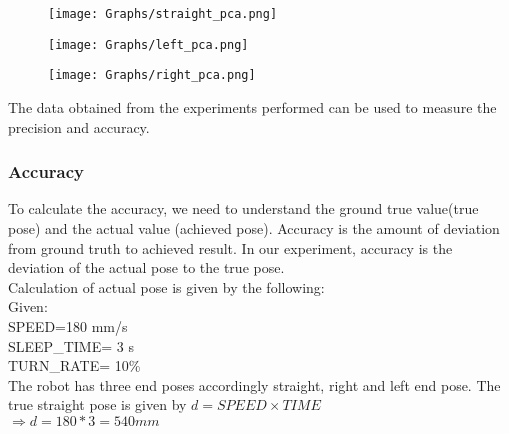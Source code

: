 \begin{figure}[H]
	\centering
	\texttt{[image: Graphs/straight\_pca.png]}
\end{figure}

\begin{figure}[H]
	\centering
	\texttt{[image: Graphs/left\_pca.png]}
\end{figure}

\begin{figure}[H]
	\centering
	\texttt{[image: Graphs/right\_pca.png]}
\end{figure}



The data obtained from the experiments performed can be used to measure the precision and accuracy.

\color{blue}\subsubsection{Accuracy}

To calculate the accuracy, we need to understand the ground true value(true pose) and the actual value (achieved pose). Accuracy is the amount of deviation from ground truth to achieved result. In our experiment, accuracy is the deviation of the actual pose to the true pose.\\
Calculation of actual pose is given by the following:\\
Given: \\
	SPEED=180 mm/s\\
	SLEEP\_TIME= 3 s \\
	TURN\_RATE= 10\% \\
	
	The robot has three end poses accordingly straight, right and left end pose.
	The true straight pose is given by $d=SPEED \times TIME$ \\
	
	$\Longrightarrow  d=180*3= 540mm $ \\
	

